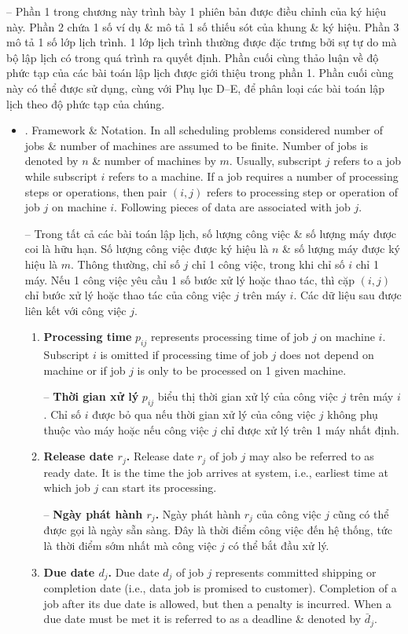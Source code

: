 \documentclass{article}
\begin{document}
\begin{itemize}
    -- Phần 1 trong chương này trình bày 1 phiên bản được điều chỉnh của ký hiệu này. Phần 2 chứa 1 số ví dụ \& mô tả 1 số thiếu sót của khung \& ký hiệu. Phần 3 mô tả 1 số lớp lịch trình. 1 lớp lịch trình thường được đặc trưng bởi sự tự do mà bộ lập lịch có trong quá trình ra quyết định. Phần cuối cùng thảo luận về độ phức tạp của các bài toán lập lịch được giới thiệu trong phần 1. Phần cuối cùng này có thể được sử dụng, cùng với Phụ lục D--E, để phân loại các bài toán lập lịch theo độ phức tạp của chúng.
    \begin{itemize}
        \item {. Framework \& Notation.} In all scheduling problems considered number of jobs \& number of machines are assumed to be finite. Number of jobs is denoted by $n$ \& number of machines by $m$. Usually, subscript $j$ refers to a job while subscript $i$ refers to a machine. If a job requires a number of processing steps or operations, then pair $(i,j)$ refers to processing step or operation of job $j$ on machine $i$. Following pieces of data are associated with job $j$.

        -- Trong tất cả các bài toán lập lịch, số lượng công việc \& số lượng máy được coi là hữu hạn. Số lượng công việc được ký hiệu là $n$ \& số lượng máy được ký hiệu là $m$. Thông thường, chỉ số $j$ chỉ 1 công việc, trong khi chỉ số $i$ chỉ 1 máy. Nếu 1 công việc yêu cầu 1 số bước xử lý hoặc thao tác, thì cặp $(i,j)$ chỉ bước xử lý hoặc thao tác của công việc $j$ trên máy $i$. Các dữ liệu sau được liên kết với công việc $j$.
        \begin{enumerate}
            \item {\bf Processing time} $p_{ij}$ represents processing time of job $j$ on machine $i$. Subscript $i$ is omitted if processing time of job $j$ does not depend on machine or if job $j$ is only to be processed on 1 given machine.

            -- {\bf Thời gian xử lý} $p_{ij}$ biểu thị thời gian xử lý của công việc $j$ trên máy $i$. Chỉ số $i$ được bỏ qua nếu thời gian xử lý của công việc $j$ không phụ thuộc vào máy hoặc nếu công việc $j$ chỉ được xử lý trên 1 máy nhất định.
            \item {\bf Release date $r_j$.} Release date $r_j$ of job $j$ may also be referred to as ready date. It is the time the job arrives at system, i.e., earliest time at which job $j$ can start its processing.

            -- {\bf Ngày phát hành $r_j$.} Ngày phát hành $r_j$ của công việc $j$ cũng có thể được gọi là ngày sẵn sàng. Đây là thời điểm công việc đến hệ thống, tức là thời điểm sớm nhất mà công việc $j$ có thể bắt đầu xử lý.
            \item {\bf Due date $d_j$.} Due date $d_j$ of job $j$ represents committed shipping or completion date (i.e., data job is promised to customer). Completion of a job after its due date is allowed, but then a penalty is incurred. When a due date must be met it is referred to as a deadline \& denoted by $\bar{d}_j$.


\end{enumerate}
\end{itemize}
\end{itemize}
\end{document}
